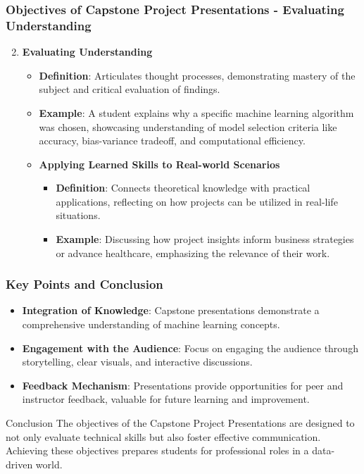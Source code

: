 \documentclass[aspectratio=169]{beamer}
\begin{document}
\begin{frame}[fragile]
    \frametitle{Objectives of Capstone Project Presentations - Evaluating Understanding}
    \begin{enumerate}
        \setcounter{enumi}{1}
        \item \textbf{Evaluating Understanding}
            \begin{itemize}
                \item \textbf{Definition}: Articulates thought processes, demonstrating mastery of the subject and critical evaluation of findings.
                \item \textbf{Example}:
                A student explains why a specific machine learning algorithm was chosen, showcasing understanding of model selection criteria like accuracy, bias-variance tradeoff, and computational efficiency.
                
        \item \textbf{Applying Learned Skills to Real-world Scenarios}
            \begin{itemize}
                \item \textbf{Definition}: Connects theoretical knowledge with practical applications, reflecting on how projects can be utilized in real-life situations.
                \item \textbf{Example}: 
                Discussing how project insights inform business strategies or advance healthcare, emphasizing the relevance of their work.
            \end{itemize}
            \end{itemize}
    \end{enumerate}
\end{frame}

\begin{frame}[fragile]
    \frametitle{Key Points and Conclusion}
    \begin{itemize}
        \item \textbf{Integration of Knowledge}: Capstone presentations demonstrate a comprehensive understanding of machine learning concepts.
        \item \textbf{Engagement with the Audience}: Focus on engaging the audience through storytelling, clear visuals, and interactive discussions.
        \item \textbf{Feedback Mechanism}: Presentations provide opportunities for peer and instructor feedback, valuable for future learning and improvement.
    \end{itemize}
    
    \begin{block}{Conclusion}
        The objectives of the Capstone Project Presentations are designed to not only evaluate technical skills but also foster effective communication. Achieving these objectives prepares students for professional roles in a data-driven world.
    \end{block}
\end{frame}
\end{document}
